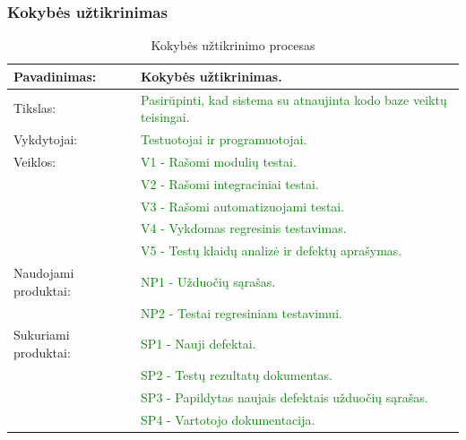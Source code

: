 \documentclass{VUMIFPSkursinis}
\begin{document}
	\subsubsection{Kokybės užtikrinimas}
	\begin{center}
		\begin{table}[ht]
			\caption{Kokybės užtikrinimo procesas}
			\begin{tabular}{ | l | l | }
				\hline
				Pavadinimas:          & Kokybės užtikrinimas.                                \\ \hline
				Tikslas:              & \textcolor{green}{Pasirūpinti, kad sistema su atnaujinta kodo baze veiktų teisingai.} \\ \hline
				Vykdytojai:	          & \textcolor{green}{Testuotojai ir programuotojai.}                       \\ \hline
				Veiklos:              & \textcolor{green}{V1 - Rašomi modulių testai.}                          \\
				                      & \textcolor{green}{V2 - Rašomi integraciniai testai.}                    \\
				                      & \textcolor{green}{V3 - Rašomi automatizuojami testai.}                  \\
				                      & \textcolor{green}{V4 - Vykdomas regresinis testavimas.}                 \\
				                      & \textcolor{green}{V5 - Testų klaidų analizė ir defektų aprašymas.}      \\ \hline
				Naudojami produktai:  & \textcolor{green}{NP1 - Užduočių sąrašas.}                              \\
				                      & \textcolor{green}{NP2 - Testai regresiniam testavimui.}                 \\ \hline
				Sukuriami produktai:  & \textcolor{green}{SP1 - Nauji defektai.}                                \\
				                      & \textcolor{green}{SP2 - Testų rezultatų dokumentas.}                    \\
				                      & \textcolor{green}{SP3 - Papildytas naujais defektais užduočių sąrašas.} \\
				                      & \textcolor{green}{SP4 - Vartotojo dokumentacija.}                       \\ \hline
			\end{tabular}
		\end{table}
	\end{center}
\end{document}
